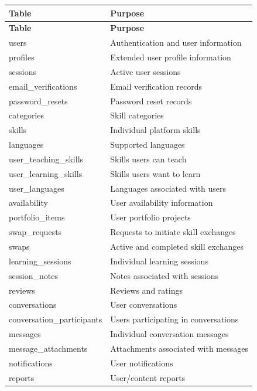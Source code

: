 \documentclass[12pt,a4paper]{report}
\begin{document}
\begin{longtable}{@{} l l @{}}
\toprule
\textbf{Table} & \textbf{Purpose} \\
\midrule
\endfirsthead
\toprule
\textbf{Table} & \textbf{Purpose} \\
\midrule
\endhead
users                  & Authentication and user information \\
profiles               & Extended user profile information \\
sessions               & Active user sessions \\
email\_verifications   & Email verification records \\
password\_resets       & Password reset records \\
categories             & Skill categories \\
skills                 & Individual platform skills \\
languages              & Supported languages \\
user\_teaching\_skills & Skills users can teach \\
user\_learning\_skills & Skills users want to learn \\
user\_languages        & Languages associated with users \\
availability           & User availability information \\
portfolio\_items       & User portfolio projects \\
swap\_requests         & Requests to initiate skill exchanges \\
swaps                  & Active and completed skill exchanges \\
learning\_sessions     & Individual learning sessions \\
session\_notes         & Notes associated with sessions \\
reviews                & Reviews and ratings \\
conversations          & User conversations \\
conversation\_participants & Users participating in conversations \\
messages               & Individual conversation messages \\
message\_attachments   & Attachments associated with messages \\
notifications          & User notifications \\
reports                & User/content reports \\
\bottomrule
\end{longtable}
\end{document}
